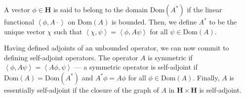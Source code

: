 \documentclass[10pt]{extarticle}
\newcommand{\iprod}[2]{\left\langle #1,#2\right\rangle}
\theoremstyle{plain}
\theoremstyle{definition}
\theoremstyle{remark}
\renewcommand{\newline}{\hfill\break}
\begin{document}
  A vector $\phi \in \mathbf{H}$ is said to belong to the domain $\text{Dom}(A^{\ast})$ if the linear functional $\iprod{\phi}{A\cdot}$ on $\text{Dom}(A)$ is bounded. Then, we define $A^{\ast}$ to be the unique vector $\chi$ such that $\iprod{\chi}{\psi} = \iprod{\phi}{A\psi}$ for all $\psi \in \text{Dom}(A)$.\newline

  Having defined adjoints of an unbounded operator, we can now commit to defining self-adjoint operators. The operator $A$ is symmetric if $\iprod{\phi}{A\psi} = \iprod{A\phi}{\psi}$ --- a symmetric operator is self-adjoint if $\text{Dom}(A) = \text{Dom}(A^{\ast})$ and $A^{\ast}\phi = A\phi$ for all $\phi \in \text{Dom}(A)$. Finally, $A$ is essentially self-adjoint if the closure of the graph of $A$ in $\mathbf{H}\times \mathbf{H}$ is self-adjoint.\newline
\end{document}
